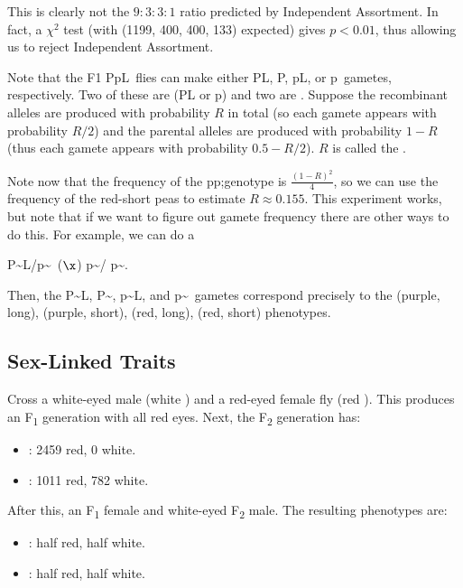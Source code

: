 This is clearly not the $9\colon 3\colon 3\colon 1$ ratio predicted by Independent Assortment.
In fact, a $\chi^2$ test (with (1199, 400, 400, 133) expected) gives $p < 0.01$, thus allowing us to reject Independent Assortment.

Note that the F1 PpL\ell\, flies can make either PL, P\ell, pL, or p\ell\, gametes, respectively. Two of these are  (PL or p\ell) and two are . Suppose the recombinant alleles are produced with probability $R$ in total (so each gamete appears with probability $R/2$) and the parental alleles are produced with probability $1-R$ (thus each gamete appears with probability $0.5 - R/2$). $R$ is called the .

Note now that the frequency of the pp;\ell\ell genotype is $\frac{(1-R)^2}{4}$, so we can use the frequency of the red-short peas to estimate $R \approx 0.155$.
This experiment works, but note that if we want to figure out gamete frequency there are other ways to do this. For example, we can do a \begin{center}
	P\sim L/p\sim \ell\, ($\x$) p\sim \ell / p\sim \ell.
\end{center}
Then, the P\sim L, P\sim \ell, p\sim L, and p\sim \ell\, gametes correspond precisely to the (purple, long), (purple, short), (red, long), (red, short) phenotypes.

\subsection{Sex-Linked Traits}

\begin{exper}
	[Morgan (1910)]
	Cross a white-eyed male (white \male) and a red-eyed female fly (red \female). This produces an F\textsubscript1 generation with all red eyes. Next, the F\textsubscript2 generation has:
	\begin{itemize}
		\item \female: 2459 red, 0 white.
		\item \male: 1011 red, 782 white.
	\end{itemize}
	After this, an F\textsubscript1 female and white-eyed F\textsubscript2 male. The resulting phenotypes are:
	\begin{itemize}
		\item \female: half red, half white.
		\item \male: half red, half white.
	\end{itemize}
\end{exper}

